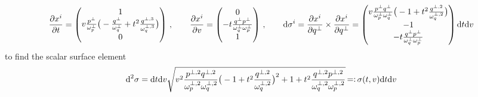 \begin{equation}
    \frac{\partial x^i}{\partial t}=\begin{pmatrix}
    1\\
    v\frac{p^\perp}{\omega_p^\perp}\big(-\frac{q^\perp}{\omega_q^\perp}+t^2\frac{q^{\perp,3}}{\omega_q^{\perp,3}}\big)\\
    0
    \end{pmatrix}\,,\qquad
    \frac{\partial x^i}{\partial v}=\begin{pmatrix}
        0\\
        -t\frac{q^\perp p^\perp}{\omega_q^\perp\omega_p^\perp}\\
        1
    \end{pmatrix}\,,\qquad
    \text{d}\sigma^i=\frac{\partial x^i}{\partial q^\perp}\times \frac{\partial x^i}{\partial q^\perp}=\begin{pmatrix}
        v\frac{p^\perp q^\perp}{\omega_p^\perp\omega_q^\perp}\big(-1+t^2\frac{q^{\perp,2}}{\omega_q^{\perp,2}}\big)\\
        -1\\
        -t\frac{q^\perp p^\perp}{\omega_q^\perp\omega_p^\perp}
    \end{pmatrix}\text{d} t\text{d} v
\end{equation}
to find the scalar surface element
\begin{equation}
    \text{d}^2\sigma=\text{d} t\text{d} v\sqrt{v^2\frac{p^{\perp,2}q^{\perp,2}}{\omega_p^{\perp,2}\omega_q^{\perp,2}}\big(-1+t^2\frac{q^{\perp,2}}{\omega_q^{\perp,2}}\big)^2+1+t^2\frac{q^{\perp,2} p^{\perp,2}}{\omega_q^{\perp,2}\omega_p^{\perp,2}}}{\,=\vcentcolon\,}\sigma(t,v)\text{d} t\text{d} v
\end{equation}